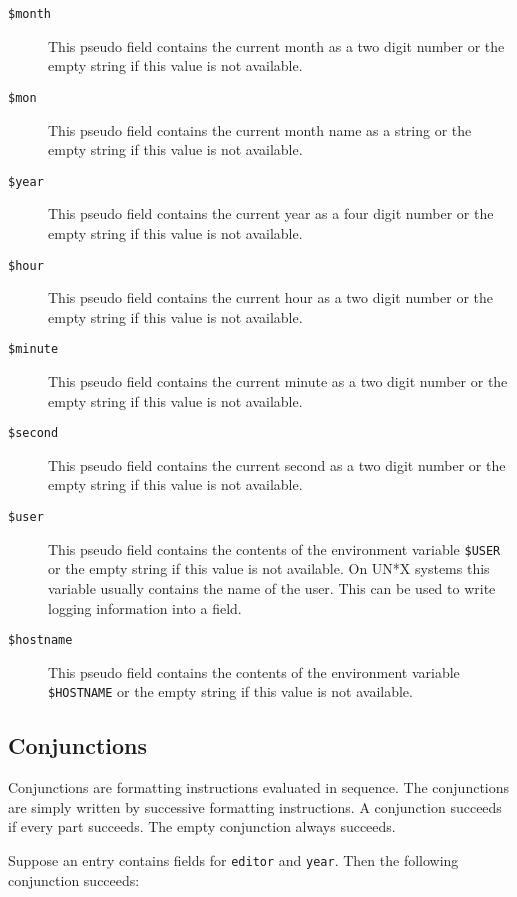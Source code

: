 \documentclass[11pt,a4paper]{scrbook}
\makeatletter
\let\BIBTEX\BibTeX
\renewcommand\BibTeX{\BIBTEX\index{bibtex@\BIBTEX}}
\makeatother
\begin{document}
\begin{description}
\item [\texttt{\$month}]%
  This pseudo field contains the current month as a two digit number or the
  empty string if this value is not available. 

\item [\texttt{\$mon}]%
  This pseudo field contains the current month name as a string or the
  empty string if this value is not available. 

\item [\texttt{\$year}]%
  This pseudo field contains the current year as a four digit number or the
  empty string if this value is not available. 

\item [\texttt{\$hour}]%
  This pseudo field contains the current hour as a two digit number or the
  empty string if this value is not available. 

\item [\texttt{\$minute}]%
  This pseudo field contains the current minute as a two digit number or the
  empty string if this value is not available. 

\item [\texttt{\$second}]%
  This pseudo field contains the current second as a two digit number or the
  empty string if this value is not available. 
  
\item [\texttt{\$user}] %
  This pseudo field contains the contents of the environment variable
  \texttt{\$USER} or the empty string if this value is not available. On UN*X
  systems this variable usually contains the name of the user. This can be
  used to write logging information into a field.

\item [\texttt{\$hostname}]%
  This pseudo field contains the contents of the environment variable
  \texttt{\$HOSTNAME} or the empty string if this value is not available.
\end{description}


\subsection{Conjunctions}

Conjunctions are formatting instructions evaluated in sequence. The
conjunctions are simply written by successive formatting instructions. A
conjunction succeeds if every part succeeds. The empty conjunction always
succeeds.

Suppose an \BibTeX{} entry contains fields for \texttt{editor} and
\texttt{year}.  Then the following conjunction succeeds:
\end{document}
